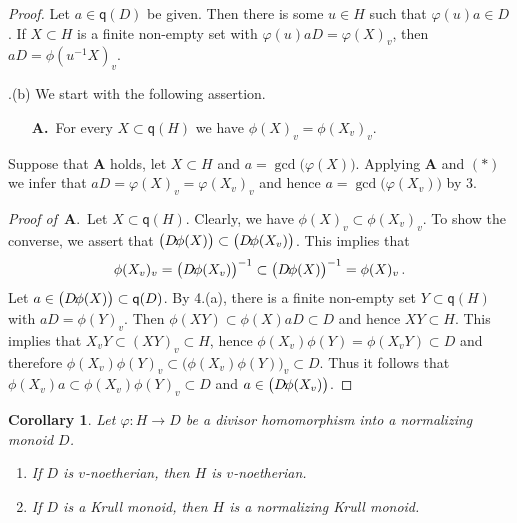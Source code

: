 \documentclass[a4paper]{amsart}
\newtheorem{corollary}[theorem]{Corollary}
\theoremstyle{definition}
\numberwithin{equation}{section}
\begin{document}
\begin{proof}
Let $a \in \mathsf q (D)$ be given. Then there is some $u \in H$
such that $\varphi (u)a \in D$. If $X \subset H$ is a finite
non-empty set with $\varphi (u) aD = \varphi (X)_v$, then $aD = \phi
(u^{-1}X)_v$.

.(b) We start with the following assertion.

\begin{enumerate}
\item[{\bf A.}\,] For every $X \subset \mathsf q (H)$ we have $\phi (X)_v = \phi (X_v)_v$.
\end{enumerate}

Suppose that {\bf A} holds, let
$X \subset H$ and $a = \gcd \big( \varphi (X) \big)$. Applying {\bf A} and $(*)$ we infer that  $aD
= \varphi (X)_v = \varphi (X_v)_v$ and hence $a = \gcd \big( \varphi
(X_v) \big)$ by 3.

\smallskip
{\it Proof of} \,{\bf A}.\, Let $X \subset \mathsf q (H)$. Clearly,
we have $\phi (X)_v \subset \phi (X_v)_v$. To show the converse, we
assert that $\big(D {\negthinspace : \negthinspace} \phi (X) \big) \subset \big( D {\negthinspace : \negthinspace} \phi
(X_v) \big)$. This implies that
\[
\phi (X_v)_v = \big( D {\negthinspace : \negthinspace} \phi (X_v) \big)^{-1} \subset \big(D {\negthinspace : \negthinspace}
\phi (X) \big)^{-1} = \phi (X)_v \,.
\]
Let $a \in \big(D {\negthinspace : \negthinspace} \phi (X) \big) \subset \mathsf q (D)$. By
4.(a), there is a finite non-empty set $Y \subset \mathsf q (H)$
with $aD = \phi (Y)_v$. Then $\phi (XY) \subset \phi (X) aD \subset
D$ and hence $XY \subset H$. This implies that $X_v Y \subset (XY)_v
\subset H$, hence $\phi (X_v) \phi (Y) = \phi (X_v Y) \subset D$ and
therefore $\phi (X_v) \phi (Y)_v \subset \big( \phi (X_v) \phi (Y)
\big)_v \subset D$. Thus it follows that $\phi (X_v)a \subset \phi
(X_v) \phi (Y)_v \subset D$ and $a \in \big( D {\negthinspace : \negthinspace} \phi (X_v)
\big)$.
\end{proof}

\medskip
\begin{corollary} \label{4.12}
Let $\varphi \colon H \to D$ be a divisor homomorphism into a
normalizing monoid $D$.
\begin{enumerate}
\item If $D$ is $v$-noetherian, then $H$ is $v$-noetherian.

\smallskip
\item If $D$ is a Krull monoid, then $H$ is a normalizing Krull
monoid.
\end{enumerate}
\end{corollary}
\end{document}
